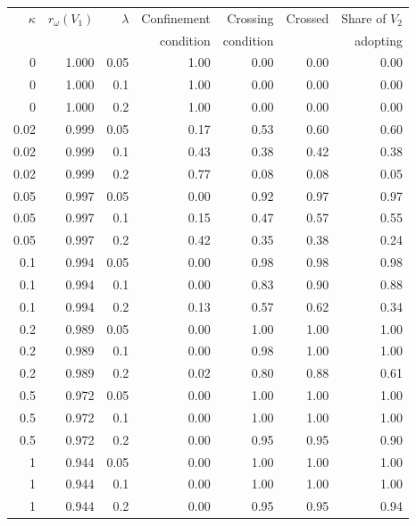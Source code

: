 \begin{tabular}{rrrrrrr}
\toprule
$\kappa$ & $r_\omega(V_1)$ & $\lambda$ & Confinement & Crossing & Crossed & Share of $V_2$ \\
 & & & condition & condition & & adopting \\
\midrule
0 & 1.000 & 0.05 & 1.00 & 0.00 & 0.00 & 0.00 \\
0 & 1.000 & 0.1 & 1.00 & 0.00 & 0.00 & 0.00 \\
0 & 1.000 & 0.2 & 1.00 & 0.00 & 0.00 & 0.00 \\
0.02 & 0.999 & 0.05 & 0.17 & 0.53 & 0.60 & 0.60 \\
0.02 & 0.999 & 0.1 & 0.43 & 0.38 & 0.42 & 0.38 \\
0.02 & 0.999 & 0.2 & 0.77 & 0.08 & 0.08 & 0.05 \\
0.05 & 0.997 & 0.05 & 0.00 & 0.92 & 0.97 & 0.97 \\
0.05 & 0.997 & 0.1 & 0.15 & 0.47 & 0.57 & 0.55 \\
0.05 & 0.997 & 0.2 & 0.42 & 0.35 & 0.38 & 0.24 \\
0.1 & 0.994 & 0.05 & 0.00 & 0.98 & 0.98 & 0.98 \\
0.1 & 0.994 & 0.1 & 0.00 & 0.83 & 0.90 & 0.88 \\
0.1 & 0.994 & 0.2 & 0.13 & 0.57 & 0.62 & 0.34 \\
0.2 & 0.989 & 0.05 & 0.00 & 1.00 & 1.00 & 1.00 \\
0.2 & 0.989 & 0.1 & 0.00 & 0.98 & 1.00 & 1.00 \\
0.2 & 0.989 & 0.2 & 0.02 & 0.80 & 0.88 & 0.61 \\
0.5 & 0.972 & 0.05 & 0.00 & 1.00 & 1.00 & 1.00 \\
0.5 & 0.972 & 0.1 & 0.00 & 1.00 & 1.00 & 1.00 \\
0.5 & 0.972 & 0.2 & 0.00 & 0.95 & 0.95 & 0.90 \\
1 & 0.944 & 0.05 & 0.00 & 1.00 & 1.00 & 1.00 \\
1 & 0.944 & 0.1 & 0.00 & 1.00 & 1.00 & 1.00 \\
1 & 0.944 & 0.2 & 0.00 & 0.95 & 0.95 & 0.94 \\
\bottomrule
\end{tabular}
